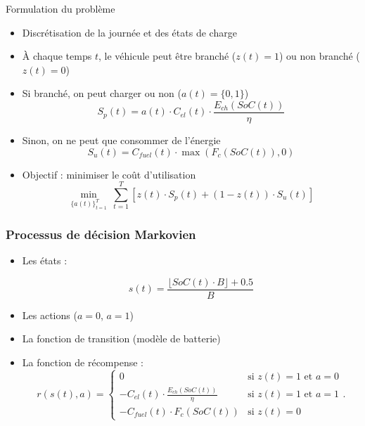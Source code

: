 \documentclass[french]{beamer}
\begin{document}
{\begin{frame}{Formulation du problème}

\begin{itemize}
	\item Discrétisation de la journée et des états de charge
	\item À chaque temps $t$, le véhicule peut être branché ($z(t)=1$) ou non branché ($z(t)=0$)
	\item Si branché, on peut charger ou non ($a(t) = \{0, 1\}$)
\begin{equation}\label{eq:costp1}
S_p(t) = a(t) \cdot C_{el}(t) \cdot \frac{E_{ch}(SoC(t))}{\eta}
\end{equation}
	\item Sinon, on ne peut que consommer de l'énergie
\begin{equation}\label{eq:costp2}
S_u(t) = C_{fuel}(t) \cdot \max(F_{c}(SoC(t)),0)
\end{equation}
	\item Objectif : minimiser le coût d'utilisation
\begin{equation}
\min_{\{a(t)\}_{t=1}^T}~\sum_{t=1}^{T} \left[z(t) \cdot S_p(t) + (1-z(t)) \cdot S_u(t)\right]
\label{eq:cost}
\end{equation}
\end{itemize}

\end{frame}


\begin{frame}
\frametitle{Processus de décision Markovien}
\begin{center}
\begin{itemize}
\item Les états :
 
\begin{equation}
s(t) = \frac{\lfloor \mathit{SoC}(t) \cdot B \rfloor + 0.5}{B} 
\label{eq:state}
\end{equation}
\item Les actions ($a=0$, $a=1$)
\item La fonction de transition (modèle de batterie)
\item La fonction de récompense :
\begin{equation}
r(s(t),a) =
\begin{cases}
0 & \text{si $z(t)=1$ et $a=0$}\\
-C_{el}(t) \cdot \frac{E_{ch}(SoC(t))}{\eta} & \text{si $z(t)=1$ et $a=1$}\\
- C_{fuel}(t) \cdot F_{c}(SoC(t)) & \text{si $z(t)=0$}   
\end{cases}.\label{eq:reward}
\end{equation}
\end{itemize}
\end{center}
\end{frame}



}
\end{document}
